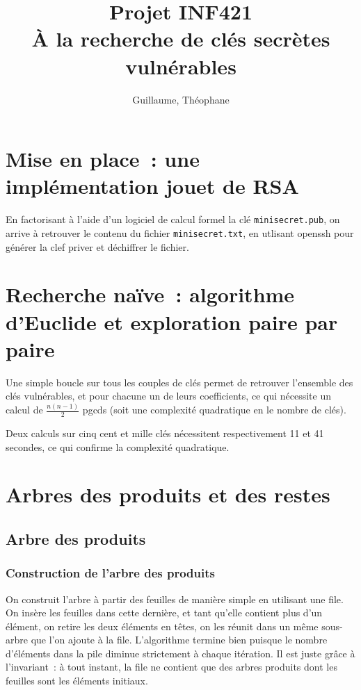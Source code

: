 \documentclass[a4paper,10pt]{article}
\title{Projet INF421 \\ À la recherche de clés secrètes vulnérables}
\author{\bsc{Hétier} Guillaume, \bsc{Hufschmitt} Théophane}
\begin{document}
\maketitle

\section{Mise en place~: une implémentation jouet de RSA}
En factorisant à l'aide d'un logiciel de calcul formel la clé \texttt{minisecret.pub}, on arrive à retrouver le contenu du fichier \texttt{minisecret.txt}, en utlisant openssh pour générer la clef priver et déchiffrer le fichier.


\section{Recherche naïve~: algorithme d'Euclide et exploration paire par paire}
Une simple boucle sur tous les couples de clés permet de retrouver l'ensemble des clés vulnérables, et pour chacune un de leurs coefficients, ce qui nécessite un calcul de $\frac{n(n-1)}{2}$ pgcds (soit une complexité quadratique en le nombre de clés).

  Deux calculs sur cinq cent et mille clés nécessitent respectivement 11 et 41 secondes, ce qui confirme la complexité quadratique.
  
  
\section{Arbres des produits et des restes}

  \subsection{Arbre des produits}
  \subsubsection{Construction de l'arbre des produits}
  On construit l'arbre à partir des feuilles de manière simple en utilisant une file. On insère les feuilles dans cette dernière, et tant qu'elle contient plus d'un élément, on retire les deux éléments en têtes, on les réunit dans un même sous-arbre que l'on ajoute à la file.
  L'algorithme termine bien puisque le nombre d'éléments dans la pile diminue strictement à chaque itération. Il est juste grâce à l'invariant~: à tout instant, la file ne contient que des arbres produits dont les feuilles sont les éléments initiaux.
  
\end{document}
